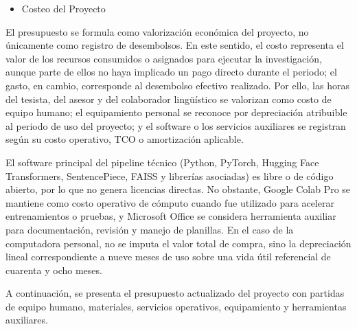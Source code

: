 \documentclass[12pt,a4paper,oneside]{book}
\begin{document}
\begin{itemize}
\begin{itemize}
    \begin{itemize}
    \item
      Computadora personal con procesador Intel i7, 32 GB RAM y GPU RTX 5060 TI 16GB.
    \end{itemize}
  \item
    Herramientas requeridas

    \begin{itemize}
    \item
      Python, PyTorch, Hugging Face Transformers y SentencePiece.
    \item
      Google Colab Pro / Kaggle como entornos de cómputo.
    \end{itemize}
  \end{itemize}
\item
  Costeo del Proyecto
\end{itemize}

El presupuesto se formula como valorización económica del proyecto, no únicamente como registro de desembolsos. En este sentido, el costo representa el valor de los recursos consumidos o asignados para ejecutar la investigación, aunque parte de ellos no haya implicado un pago directo durante el periodo; el gasto, en cambio, corresponde al desembolso efectivo realizado. Por ello, las horas del tesista, del asesor y del colaborador lingüístico se valorizan como costo de equipo humano; el equipamiento personal se reconoce por depreciación atribuible al periodo de uso del proyecto; y el software o los servicios auxiliares se registran según su costo operativo, TCO o amortización aplicable.

El software principal del pipeline técnico (Python, PyTorch, Hugging Face Transformers, SentencePiece, FAISS y librerías asociadas) es libre o de código abierto, por lo que no genera licencias directas. No obstante, Google Colab Pro se mantiene como costo operativo de cómputo cuando fue utilizado para acelerar entrenamientos o pruebas, y Microsoft Office se considera herramienta auxiliar para documentación, revisión y manejo de planillas. En el caso de la computadora personal, no se imputa el valor total de compra, sino la depreciación lineal correspondiente a nueve meses de uso sobre una vida útil referencial de cuarenta y ocho meses.

A continuación, se presenta el presupuesto actualizado del proyecto con partidas de equipo humano, materiales, servicios operativos, equipamiento y herramientas auxiliares.
\end{document}
